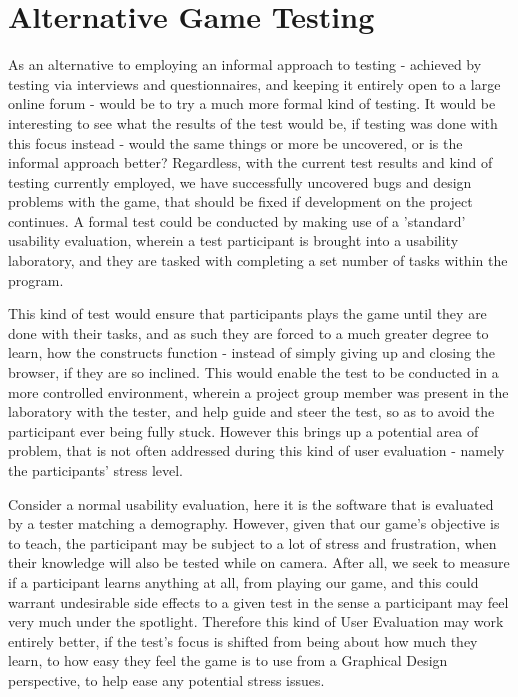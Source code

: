 \section{Alternative Game Testing}

As an alternative to employing an informal approach to testing - achieved by testing via interviews and questionnaires, and keeping it entirely open to a large online forum - would be to try a much more formal kind of testing. It would be interesting to see what the results of the test would be, if testing was done with this focus instead - would the same things or more be uncovered, or is the informal approach better? Regardless, with the current test results and kind of testing currently employed, we have successfully uncovered bugs and design problems with the game, that should be fixed if development on the project continues. A formal test could be conducted by making use of a 'standard' usability evaluation, wherein a test participant is brought into a usability laboratory, and they are tasked with completing a set number of tasks within the program. 


This kind of test would ensure that participants plays the game until they are done with their tasks, and as such they are forced to a much greater degree to learn, how the constructs function - instead of simply giving up and closing the browser, if they are so inclined. This would enable the test to be conducted in a more controlled environment, wherein a project group member was present in the laboratory with the tester, and help guide and steer the test, so as to avoid the participant ever being fully stuck. However this brings up a potential area of problem, that is not often addressed during this kind of user evaluation - namely the participants' stress level.


Consider a normal usability evaluation, here it is the software that is evaluated by a tester matching a demography. However, given that our game's objective is to teach, the participant may be subject to a lot of stress and frustration, when their knowledge will also be tested while on camera. After all, we seek to measure if a participant learns anything at all, from playing our game, and this could warrant undesirable side effects to a given test in the sense a participant may feel very much under the spotlight. Therefore this kind of User Evaluation may work entirely better, if the test's focus is shifted from being about how much they learn, to how easy they feel the game is to use from a Graphical Design perspective, to help ease any potential stress issues.